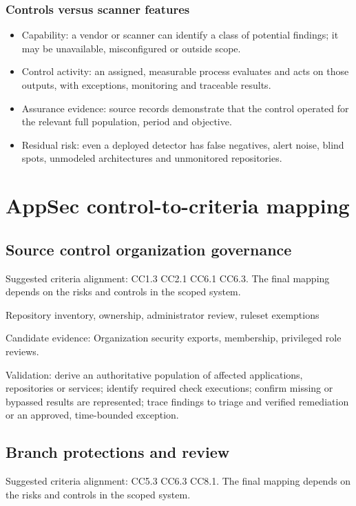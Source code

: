 \documentclass[10pt,oneside]{report}
\begin{document}
\subsection{Controls versus scanner features}
\begin{itemize}
\item Capability: a vendor or scanner can identify a class of potential findings; it may be unavailable, misconfigured or outside scope.
\item Control activity: an assigned, measurable process evaluates and acts on those outputs, with exceptions, monitoring and traceable results.
\item Assurance evidence: source records demonstrate that the control operated for the relevant full population, period and objective.
\item Residual risk: even a deployed detector has false negatives, alert noise, blind spots, unmodeled architectures and unmonitored repositories.
\end{itemize}

\chapter{AppSec control-to-criteria mapping}
\section{Source control organization governance}
Suggested criteria alignment: CC1.3 CC2.1 CC6.1 CC6.3. The final mapping depends on the risks and controls in the scoped system.

\begin{engineeringbox}
Repository inventory, ownership, administrator review, ruleset exemptions
\end{engineeringbox}
Candidate evidence: Organization security exports, membership, privileged role reviews.

Validation: derive an authoritative population of affected applications, repositories or services; identify required check executions; confirm missing or bypassed results are represented; trace findings to triage and verified remediation or an approved, time-bounded exception.

\section{Branch protections and review}
Suggested criteria alignment: CC5.3 CC6.3 CC8.1. The final mapping depends on the risks and controls in the scoped system.
\end{document}
